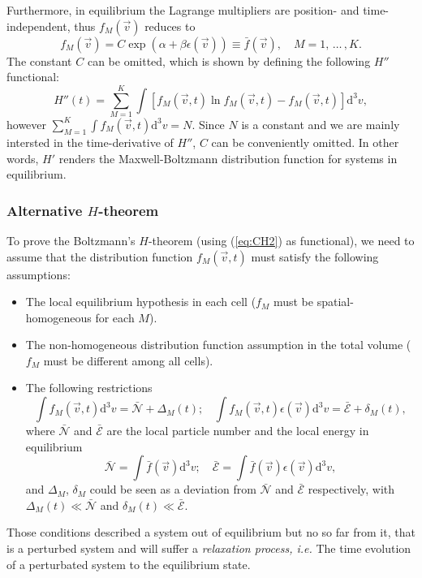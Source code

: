Furthermore, in equilibrium the Lagrange multipliers are position- and time-independent,
thus $f_M(\vec{v})$
reduces to
%
\begin{equation}
    f_M(\vec{v})=C\exp\left(\alpha+\beta \epsilon(\vec{v})\right)
    \equiv \bar{f}(\vec{v}),\quad M=1,\,\dots\,,K.
\end{equation} 
%
The constant $C$ can be omitted, which is shown by defining the following $H''$
functional:
%
\begin{equation}
   H''(t)=\sum_{M=1}^{K}\int \left[f_M(\vec{v},t)
    \ln f_M(\vec{v},t)-f_M(\vec{v},t)\right]\mathrm{d}^3v  \label{CH3},
\end{equation}
%
however $\sum_{M=1}^{K} \int f_M(\vec{v},t)\mathrm{d}^3v =N$.
Since $N$ is a constant and we are mainly intersted in the time-derivative of $H''$,
$C$ can be conveniently omitted. In other words, $H'$ renders the Maxwell-Boltzmann
distribution function for systems in equilibrium.

\subsubsection{Alternative $H$-theorem}

To prove the Boltzmann's $H$-theorem (using (\ref{eq:CH2}) as functional), we need
to assume that the distribution function $f_M(\vec{v},t)$ must satisfy the
following assumptions:
%
\begin{itemize}
  \item The local equilibrium hypothesis in each cell ($f_{M}$ must be
    spatial-homogeneous for each $M$).
  \item The non-homogeneous distribution function assumption in the total
    volume ($f_{M}$ must be different among all cells).
  \item The following restrictions
    \begin{equation}\label{restrictionoutsideclassical}
      \int f_{M}(\vec{v},t) \mathrm{d}^{3}v=
      \bar{\mathcal{N}}+\Delta_M(t); \ \ \ \ 
      \int f_{M}(\vec{v},t) \epsilon(\vec{v}) \mathrm{d}^{3}v=
      \bar{\mathcal{E}}+ \delta_M(t),
    \end{equation}
    where $\bar {\mathcal{N}}$ and $\bar{\mathcal{E}}$ are
    the local particle number and the local energy in equilibrium
    \begin{equation}
      \bar{\mathcal{N}}=
      \int \bar{f}(\vec{v}) \mathrm{d}^{3}v ; \quad
      \bar{\mathcal{E}}=
      \int \bar{f}(\vec{v})\epsilon(\vec{v}) \mathrm{d}^{3}v,
    \end{equation}
    and $\Delta_M$, $\delta_M$ could be seen as a deviation from
    $\bar{\mathcal{N}}$ and $\bar{\mathcal{E}}$ respectively,
    with $\Delta_M(t)\ll\bar{\mathcal{N}}$ and
    $\delta_M(t)\ll\bar{\mathcal{E}}$.
\end{itemize} 
%
Those conditions described a system out of equilibrium but no so far from it,
that is a perturbed system and will suffer a \textit{relaxation process, i.e.}
The time evolution of a perturbated system to the equilibrium state.

